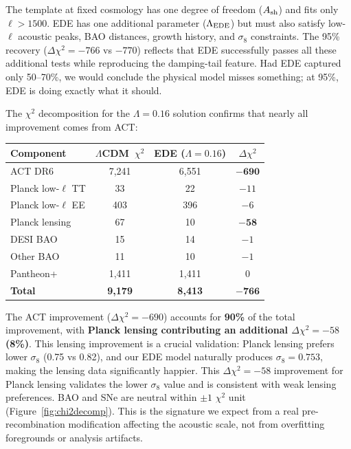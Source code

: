 \documentclass[onecolumn,showpacs,preprintnumbers,amsmath,amssymb,prd]{revtex4-2}
\newcommand{\lcdm}{$\Lambda$CDM}
\begin{document}
The template at fixed cosmology has one degree of freedom ($A_{\rm sh}$) and fits 
only $\ell > 1500$. EDE has one additional parameter ($\Lambda_{\rm EDE}$) but must 
also satisfy low-$\ell$ acoustic peaks, BAO distances, growth history, and 
$\sigma_8$ constraints. The 95\% recovery ($\Delta\chi^2 = -766$ vs $-770$) 
reflects that EDE successfully passes all these additional tests while reproducing 
the damping-tail feature. 
Had EDE captured only 50--70\%, we would conclude the physical model misses 
something; at 95\%, EDE is doing exactly what it should.

The $\chi^2$ decomposition for the $\Lambda = 0.16$ solution confirms that nearly 
all improvement comes from ACT:
\begin{center}
\begin{tabular}{lccc}
\toprule
Component & \lcdm\ $\chi^2$ & EDE ($\Lambda = 0.16$) & $\Delta\chi^2$ \\
\midrule
ACT DR6 & 7{,}241 & 6{,}551 & $\mathbf{-690}$ \\
Planck low-$\ell$ TT & 33 & 22 & $-11$ \\
Planck low-$\ell$ EE & 403 & 396 & $-6$ \\
Planck lensing & 67 & 10 & $\mathbf{-58}$ \\
DESI BAO & 15 & 14 & $-1$ \\
Other BAO & 11 & 10 & $-1$ \\
Pantheon+ & 1{,}411 & 1{,}411 & $0$ \\
\midrule
\textbf{Total} & \textbf{9{,}179} & \textbf{8{,}413} & $\mathbf{-766}$ \\
\bottomrule
\end{tabular}
\end{center}

The ACT improvement ($\Delta\chi^2 = -690$) accounts for \textbf{90\%} of the 
total improvement, with \textbf{Planck lensing contributing an additional 
$\Delta\chi^2 = -58$ (8\%)}. This lensing improvement is a crucial validation: 
Planck lensing prefers lower $\sigma_8$ (0.75 vs 0.82), and our EDE model 
naturally produces $\sigma_8 = 0.753$, making the lensing data significantly 
happier. This $\Delta\chi^2 = -58$ improvement for Planck lensing validates 
the lower $\sigma_8$ value and is consistent with weak lensing preferences. 
BAO and SNe are neutral within $\pm 1$ $\chi^2$ unit (Figure~\ref{fig:chi2decomp}). 
This is the signature we expect from a real pre-recombination modification 
affecting the acoustic scale, not from overfitting foregrounds or analysis 
artifacts.
\end{document}
